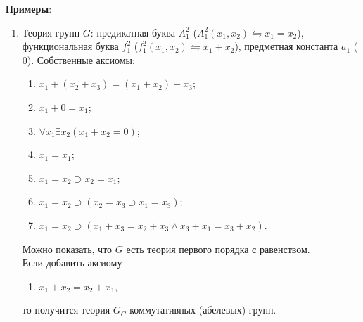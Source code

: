 \textbf{Примеры}:
\begin{enumerate}
    \item Теория групп $G$: предикатная буква $A_1^2$ ($A_1^2(x_1, x_2) \leftrightharpoons x_1 = x_2$), функциональная буква $f_1^2$ ($f_1^2(x_1, x_2) \leftrightharpoons x_1 + x_2$), предметная константа $a_1$ ($0$). Собственные аксиомы:
    \begin{enumerate}[label=\Alph*.]
        \item $x_1 + (x_2 + x_3) = (x_1 + x_2) + x_3$;
        \item $x_1 + 0 = x_1$;
        \item $\forall x_1\exists x_2(x_1 + x_2 = 0)$;
        \item $x_1 = x_1$;
        \item $x_1 = x_2 \supset x_2 = x_1$;
        \item $x_1 = x_2 \supset (x_2 = x_3 \supset x_1 = x_3)$;
        \item $x_1 = x_2 \supset (x_1 + x_3 = x_2 + x_3 \land x_3 + x_1 = x_3 + x_2)$.
    \end{enumerate}
    Можно показать, что $G$ есть теория первого порядка с равенством. \\
    Если добавить аксиому
    \begin{enumerate}[label=\Alph*., start=8]
        \item $x_1 + x_2 = x_2 + x_1$,
    \end{enumerate}
    то получится теория $G_C$ коммутативных (абелевых) групп.


\end{enumerate}
